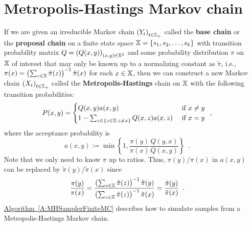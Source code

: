 

\section{Metropolis-Hastings Markov chain}

\begin{definition}\label{D:M-HChain}
If we are given an irreducible Markov chain $\left(Y_t\right)_{t\in \mathbb{Z}_+}$ called the {\bf base chain} or the {\bf proposal chain} on a finite state space $\mathbb{X} = \{s_1,s_2,\ldots,s_k\}$ with transition probability matrix $Q = \left(Q(x,y)\right)_{(x,y)\in \mathbb{X}^2}$ and some probability distribution $\pi$ on $\mathbb{X}$ of interest that may only be known up to a normalizing constant as $\tilde{\pi}$, i.e., $\pi(x) = \left(\sum_{z \in \mathbb{X}}{\tilde{\pi}(z)}\right)^{-1} \tilde{\pi}(x)$ for each $x \in \mathbb{X}$, then we can construct a new Markov chain $\left(X_t\right)_{t\in \mathbb{Z}_+}$ called the {\bf Metropolis-Hastings} chain on $\mathbb{X}$ with the following transition probabilities:
\begin{equation}\label{E:M-HPs}
P(x,y) = 
\begin{cases}
Q(x,y) a(x,y) & \text{ if } x \neq y\\
1 - \sum_{z \in \{z \in \mathbb{X} : z \neq x\}} Q(x,z) a(x,z) & \text{ if } x = y 
\end{cases} \enspace ,
\end{equation}
where the acceptance probability is
\begin{equation}\label{E:M-Ha}
a(x,y) := \min\left\{ 1, \frac{\pi(y)}{\pi(x)}\frac{Q(y,x)}{Q(x,y)} \right\} \enspace .
\end{equation}
Note that we only need to know $\pi$ up to ratios.  Thus, ${\pi(y)}/{\pi(x)}$ in $a(x,y)$ can be replaced by ${\tilde{\pi}(y)}/{\tilde{\pi}(x)}$ since
\[
\frac{\pi(y)}{\pi(x)}  
= \frac{\left(\sum_{z \in \mathbb{X}}{\tilde{\pi}(z)}\right)^{-1} \tilde{\pi}(y)}{\left(\sum_{z \in \mathbb{X}}{\tilde{\pi}(z)}\right)^{-1} \tilde{\pi}(x)} 
= \frac{\tilde{\pi}(y)}{\tilde{\pi}(x)} \enspace .
\]
\hyperref[A:MHSamplerFiniteMC]{Algorithm~\ref*{A:MHSamplerFiniteMC}} describes how to simulate samples from a Metropolis-Hastings Markov chain.  
\end{definition}

